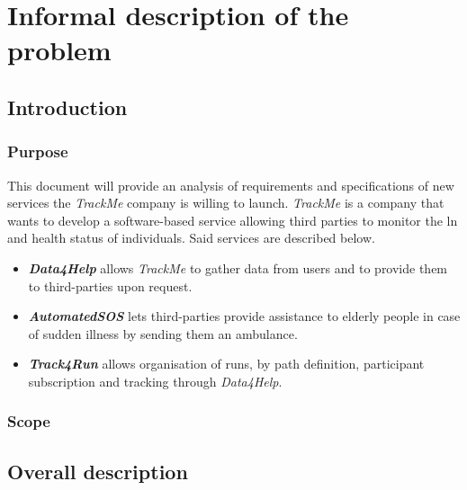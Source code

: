 \documentclass{report}
\begin{document}

\normalfont
\newpage

\part{Informal description of the problem}

\chapter{Introduction}

\section{Purpose}
This document will provide an analysis of requirements and specifications of new services the \emph{TrackMe} company is willing to launch.
\emph{TrackMe} is a company that wants to develop a software-based service allowing third parties to monitor the ln and health status of individuals.
Said services are described below.

\begin{itemize}
    \item
    \textbf{\emph{Data4Help}} allows \emph{TrackMe} to gather data from users and to provide them to third-parties upon request.

    \item
    \textbf{\emph{AutomatedSOS}} lets third-parties provide assistance to elderly people in case of sudden illness by sending them an ambulance.
    
    \item
    \textbf{\emph{Track4Run}} allows organisation of runs, by path definition, participant subscription and tracking through \emph{Data4Help}.

\end{itemize}

\section{Scope}



\chapter{Overall description}
\end{document}
